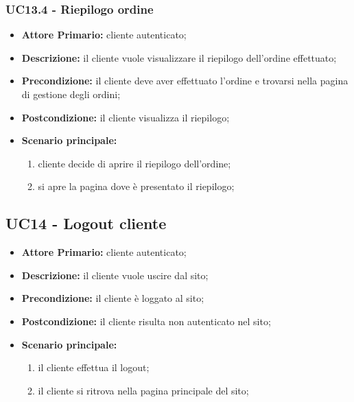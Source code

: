 \subsubsection{UC13.4 - Riepilogo ordine}
\label{UC13.4}
\begin{itemize}
\item \textbf{Attore Primario:} cliente autenticato;
\item \textbf{Descrizione:} il cliente vuole visualizzare il riepilogo dell'ordine effettuato;
\item \textbf{Precondizione:} il cliente deve aver effettuato l'ordine e trovarsi nella pagina di gestione degli ordini;
\item \textbf{Postcondizione:} il cliente visualizza il riepilogo;
\item \textbf{Scenario principale:}
\begin{enumerate}
    \item cliente decide di aprire il riepilogo dell'ordine;
    \item si apre la pagina dove è presentato il riepilogo;
\end{enumerate}
\end{itemize}

\subsection{UC14 - Logout cliente}
\label{UC14}
\begin{itemize}
    \item \textbf{Attore Primario:} cliente autenticato;
    \item \textbf{Descrizione:} il cliente vuole uscire dal sito;
    \item \textbf{Precondizione:} il cliente è loggato al sito;
    \item \textbf{Postcondizione:} il cliente risulta non autenticato nel sito;
    \item \textbf{Scenario principale:}
    \begin{enumerate}
        \item il cliente effettua il logout;
        \item il cliente si ritrova nella pagina principale del sito;
    \end{enumerate}
\end{itemize}

